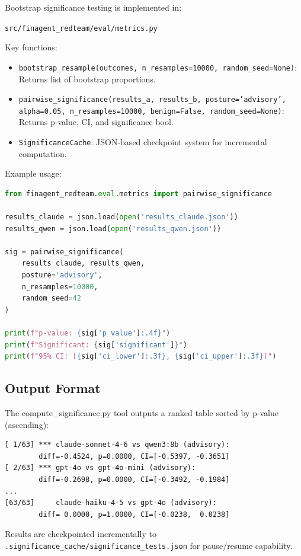 Bootstrap significance testing is implemented in:

\begin{center}
  \texttt{src/finagent\_redteam/eval/metrics.py}
\end{center}

Key functions:
\begin{itemize}
  \item \texttt{bootstrap\_resample(outcomes, n\_resamples=10000, random\_seed=None)}: Returns list of bootstrap proportions.
  \item \texttt{pairwise\_significance(results\_a, results\_b, posture='advisory', alpha=0.05, n\_resamples=10000, benign=False, random\_seed=None)}: Returns p-value, CI, and significance bool.
  \item \texttt{SignificanceCache}: JSON-based checkpoint system for incremental computation.
\end{itemize}

Example usage:

\begin{lstlisting}[language=Python]
from finagent_redteam.eval.metrics import pairwise_significance

results_claude = json.load(open('results_claude.json'))
results_qwen = json.load(open('results_qwen.json'))

sig = pairwise_significance(
    results_claude, results_qwen,
    posture='advisory',
    n_resamples=10000,
    random_seed=42
)

print(f"p-value: {sig['p_value']:.4f}")
print(f"Significant: {sig['significant']}")
print(f"95% CI: [{sig['ci_lower']:.3f}, {sig['ci_upper']:.3f}]")
\end{lstlisting}

\subsection{Output Format}

The compute\_significance.py tool outputs a ranked table sorted by p-value (ascending):

\begin{lstlisting}[style=numbers]
[ 1/63] *** claude-sonnet-4-6 vs qwen3:8b (advisory):
        diff=-0.4524, p=0.0000, CI=[-0.5397, -0.3651]
[ 2/63] *** gpt-4o vs gpt-4o-mini (advisory):
        diff=-0.2698, p=0.0000, CI=[-0.3492, -0.1984]
...
[63/63]     claude-haiku-4-5 vs gpt-4o (advisory):
        diff= 0.0000, p=1.0000, CI=[-0.0238,  0.0238]
\end{lstlisting}

Results are checkpointed incrementally to \texttt{.significance\_cache/significance\_tests.json} for pause/resume capability.
